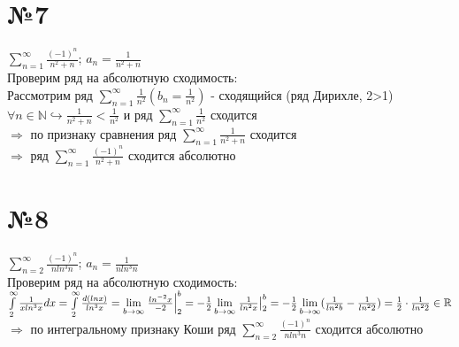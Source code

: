 \documentclass[a4paper,12pt]{article}
\begin{document}
\section*{№7}
	$\sum\limits_{n=1}^{\infty} \frac{(-1)^n}{n^2+n}$;
	$a_n = \frac{1}{n^2+n}$\\
	Проверим ряд на абсолютную сходимость:\\
	Рассмотрим ряд $\sum\limits_{n=1}^{\infty} \frac{1}{n^2} (b_n = \frac{1}{n^2})$
	- сходящийся (ряд Дирихле, 2>1)\\
	$\forall n \in \mathbb{N} \hookrightarrow \frac{1}{n^2+n} < \frac{1}{n^2}$ 
	и ряд $\sum\limits_{n=1}^{\infty} \frac{1}{n^2}$ сходится\\
	$\Rightarrow$ по признаку сравнения ряд 
	$\sum\limits_{n=1}^{\infty} \frac{1}{n^2+n}$ сходится\\
	$\Rightarrow$ ряд $\sum\limits_{n=1}^{\infty} \frac{(-1)^n}{n^2+n}$ сходится абсолютно
	
\newpage
\section*{№8}
	$\sum\limits_{n=2}^{\infty} \frac{(-1)^n}{nln^3n}$;
	$a_n = \frac{1}{nln^3n}$\\
	Проверим ряд на абсолютную сходимость:\\
	$
	\int\limits_2^\infty \frac{1}{xln^3x}dx = 
	\int\limits_2^\infty \frac{d(lnx)}{ln^3x} =
	\lim\limits_{b\to\infty} \left. {\frac{ln^{-2}x}{-2}} \right|_2^b =
	-\frac{1}{2}\lim\limits_{b\to\infty} \left. {\frac{1}{ln^2x}} \right|_2^b =
	-\frac{1}{2}\lim\limits_{b\to\infty} (\frac{1}{ln^2b}-\frac{1}{ln^22}) = 
	\frac{1}{2}\cdot \frac{1}{ln^22} \in \mathbb{R}\\
	$
	$\Rightarrow$ по интегральному признаку Коши ряд $\sum\limits_{n=2}^{\infty} \frac{(-1)^n}{nln^3n}$ сходится абсолютно
	
	
\end{document}
